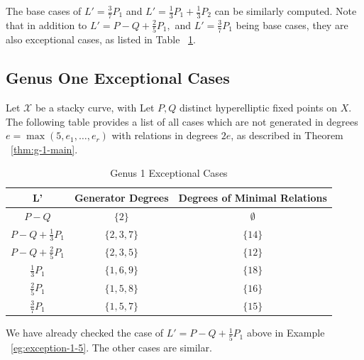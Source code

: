 \documentclass{amsart}
\theoremstyle{plain}
\theoremstyle{definition}
\theoremstyle{remark}
\newtheorem{rem}[thm]{Remark}
\numberwithin{equation}{section}
\newcommand\ssec{\subsection}
\newcommand \sx{\mathscr X}
\begin{document}
The base cases of $L' = \frac{3}{7}P_1$ and $L' = \frac{1}{3}P_1 +\frac{1}{3}P_2$ can be similarly computed. Note that in addition to $L' = P - Q + \frac{2}{5}P_1,$ and $L' = \frac{3}{7}P_1$ being base cases, they are also exceptional cases, as listed in Table ~\ref{table:g-1-exceptional}.

\ssec{Genus One Exceptional Cases}
\label{ssec:g-1-exceptional}
Let $\sx$ be a stacky curve, with Let $P,Q$ distinct hyperelliptic fixed points on $X$. The following table provides a list of all cases which are not generated in degrees $e=\max(5,e_1,\ldots, e_r)$ with relations in degrees $2e$, as described in Theorem ~\ref{thm:g-1-main}.

\begin{longtable}	{| c || c | c |}
	\caption{Genus 1 Exceptional Cases}
	\label{table:g-1-exceptional}
	
	\tabularnewline
	
	\hline
	L' & Generator Degrees & Degrees of Minimal Relations \\
	\hline
	\hline
	$P - Q$ & $\{2\}$ & $\emptyset$ \\	\hline

	$P - Q + \frac{1}{3}P_1$ & $\{2,3,7\}$ & $\{14\}$ \\	\hline

	$P - Q + \frac{2}{5}P_1$ & $\{2,3,5\}$ & $\{12\}$ \\	\hline
	
	$\frac{1}{3}P_1$ & $\{1,6,9\}$ & $\{18\}$ \\	\hline

	$\frac{2}{5}P_1$ & $\{1,5,8\}$ & $\{16\}$ \\	\hline
	
	$\frac{3}{7}P_1$ & $\{1,5,7\}$ & $\{15\}$ \\	\hline
	
	
\end{longtable}


We have already checked the case of 
$L' = P - Q + \frac{1}{5}P_1$ above in Example ~\ref{eg:exception-1-5}. The other cases are similar.
\end{document}

